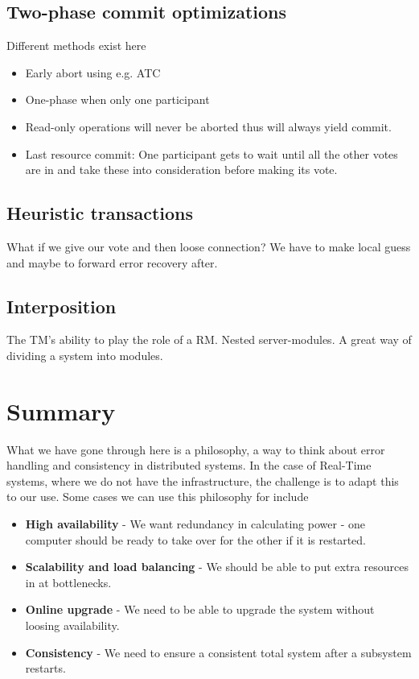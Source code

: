 \subsection{Two-phase commit optimizations}
Different methods exist here
\begin{itemize}
\item Early abort using e.g. ATC
\item One-phase when only one participant
\item Read-only operations will never be aborted thus will always yield commit.
\item Last resource commit: One participant gets to wait until all the other votes are in and take these into consideration before making its vote.
\end{itemize}

\subsection{Heuristic transactions}
What if we give our vote and then loose connection? We have to make local guess and maybe to forward error recovery after.

\subsection{Interposition}
The TM's ability to play the role of a RM. Nested server-modules. A great way of dividing a system into modules.

\section{Summary }
What we have gone through here is a philosophy, a way to think about error handling and consistency in distributed systems. In the case of Real-Time systems, where we do not have the infrastructure, the challenge is to adapt this to our use. Some cases we can use this philosophy for include
\begin{itemize}
\item \textbf{High availability} - We want redundancy in calculating power - one computer should be ready to take over for the other if it is restarted.
\item \textbf{Scalability and load balancing} - We should be able to put extra resources in at bottlenecks.
\item \textbf{Online upgrade} - We need to be able to upgrade the system without loosing availability.
\item \textbf{Consistency} - We need to ensure a consistent total system after a subsystem restarts.

\end{itemize}